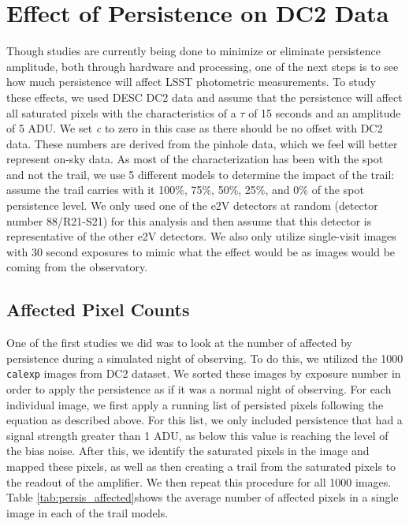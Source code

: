\documentclass[DM,authoryear,toc]{lsstdoc}
\begin{document}
\section{Effect of Persistence on DC2 Data}

Though studies are currently being done to minimize or eliminate persistence amplitude, both through hardware and processing, one of the next steps is to see how much persistence will affect LSST photometric measurements.
To study these effects, we used DESC DC2 data and assume that the persistence will affect all saturated pixels with the characteristics of a \textit{$\tau$} of 15 seconds and an amplitude of 5 ADU\@.
We set \textit{c} to zero in this case as there should be no offset with DC2 data.
These numbers are derived from the pinhole data, which we feel will better represent on-sky data.
As most of the characterization has been with the spot and not the trail, we use 5 different models to determine the impact of the trail: assume the trail carries with it 100\%, 75\%, 50\%, 25\%, and 0\% of the spot persistence level.
We only used one of the e2V detectors at random (detector number 88/R21-S21) for this analysis and then assume that this detector is representative of the other e2V detectors.
We also only utilize single-visit images with 30 second exposures to mimic what the effect would be as images would be coming from the observatory.

\subsection{Affected Pixel Counts}

One of the first studies we did was to look at the number of affected by persistence during a simulated night of observing.
To do this, we utilized the 1000 \texttt{calexp} images from DC2 dataset. 
We sorted these images by exposure number in order to apply the persistence as if it was a normal night of observing.
For each individual image, we first apply a running list of persisted pixels following the equation as described above.
For this list, we only included persistence that had a signal strength greater than 1 ADU, as below this value is reaching the level of the bias noise.
After this, we identify the saturated pixels in the image and mapped these pixels, as well as then creating a trail from the saturated pixels to the readout of the amplifier.
We then repeat this procedure for all 1000 images.
Table \ref{tab:persis_affected}shows the average number of affected pixels in a single image in each of the trail models.
\end{document}
